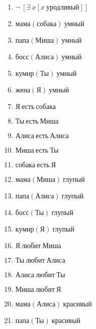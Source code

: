 \documentclass{article}
\begin{document}
\begin{enumerate}
\item $\neg \ [\exists \ x[x \ \text{уродливый}]]$

\item $\text{мама}(\text{собака}) \ \text{умный}$

\item $\text{папа}(\text{Миша}) \ \text{умный}$

\item $\text{босс}(\text{Алиса}) \ \text{умный}$

\item $\text{кумир}(\text{Ты}) \ \text{умный}$

\item $\text{жена}(\text{Я}) \ \text{умный}$

\item $\text{Я} \ \text{есть} \ \text{собака}$

\item $\text{Ты} \ \text{есть} \ \text{Миша}$

\item $\text{Алиса} \ \text{есть} \ \text{Алиса}$

\item $\text{Миша} \ \text{есть} \ \text{Ты}$

\item $\text{собака} \ \text{есть} \ \text{Я}$

\item $\text{мама}(\text{Миша}) \ \text{глупый}$

\item $\text{папа}(\text{Алиса}) \ \text{глупый}$

\item $\text{босс}(\text{Ты}) \ \text{глупый}$

\item $\text{кумир}(\text{Я}) \ \text{глупый}$

\item $\text{Я} \ \text{любит} \ \text{Миша}$

\item $\text{Ты} \ \text{любит} \ \text{Алиса}$

\item $\text{Алиса} \ \text{любит} \ \text{Ты}$

\item $\text{Миша} \ \text{любит} \ \text{Я}$

\item $\text{мама}(\text{Алиса}) \ \text{красивый}$

\item $\text{папа}(\text{Ты}) \ \text{красивый}$


\end{enumerate}
\end{document}
